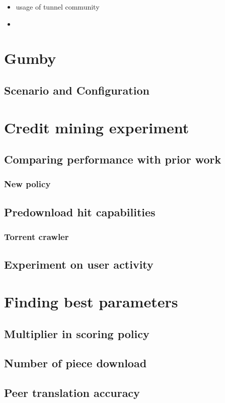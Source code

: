 \begin{itemize}
	\item  usage of tunnel community
	\item  
\end{itemize}

\section{Gumby}
\subsection{Scenario and Configuration}

\section{Credit mining experiment}
\subsection{Comparing performance with prior work}
\subsubsection{New policy}
\subsection{Predownload hit capabilities}
\subsubsection{Torrent crawler}
\subsection{Experiment on user activity}

\section{Finding best parameters}
\subsection{Multiplier in scoring policy}
\subsection{Number of piece download}
\subsection{Peer translation accuracy}


